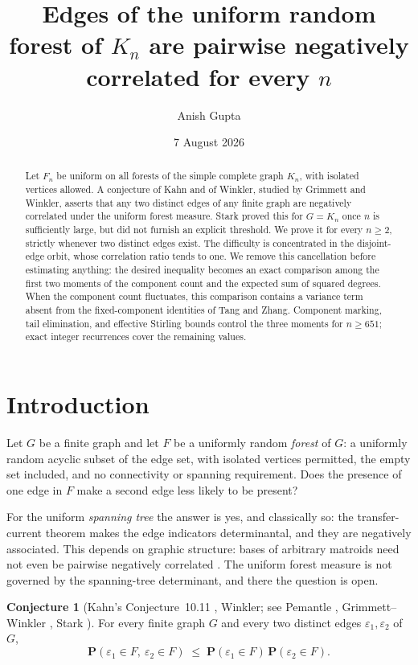 \documentclass[11pt,a4paper]{amsart}
\title[Negative correlation in uniform forests of $K_n$]
  {Edges of the uniform random forest of $K_n$ are pairwise negatively
  correlated for every $n$}
\author{Anish Gupta}
\date{7 August 2026}
\theoremstyle{plain}
\theoremstyle{definition}
\newtheorem{conjecture}[theorem]{Conjecture}
\newcommand{\PR}{\mathbf{P}}
\begin{document}
\begin{abstract}
Let $F_n$ be uniform on all forests of the simple complete graph $K_n$, with
isolated vertices allowed. A conjecture of Kahn and of Winkler, studied by
Grimmett and Winkler, asserts that any two distinct edges of any finite graph
are negatively correlated under the uniform forest measure. Stark proved this
for $G=K_n$ once $n$ is sufficiently large, but did not furnish an explicit
threshold. We prove it for every $n\ge2$, strictly whenever two
distinct edges exist. The difficulty is concentrated in the disjoint-edge
orbit, whose correlation ratio tends to one. We remove this cancellation
before estimating anything: the desired inequality becomes an exact comparison
among the first two moments of the component count and the expected sum of
squared degrees. When the component count fluctuates, this comparison contains
a variance term absent from the fixed-component identities of Tang and Zhang.
Component marking, tail elimination, and effective Stirling bounds control the
three moments for $n\ge651$; exact integer recurrences cover the remaining
values.
\end{abstract}

\maketitle

\section{Introduction}

Let $G$ be a finite graph and let $F$ be a uniformly random \emph{forest} of $G$:
a uniformly random acyclic subset of the edge set, with isolated vertices
permitted, the empty set included, and no connectivity or spanning requirement.
Does the presence of one edge in $F$ make a second edge less likely to be
present?

For the uniform \emph{spanning tree} the answer is yes, and classically so: the
transfer-current theorem makes the edge indicators determinantal, and they are
negatively associated. This depends on graphic structure: bases of arbitrary
matroids need not even be pairwise negatively correlated \cite{HSW2022}. The
uniform forest measure is not governed by the spanning-tree determinant, and
there the question is open.

\begin{conjecture}[Kahn's Conjecture~10.11 \cite{Kahn2000}, Winkler; see Pemantle \cite{Pemantle2000}, Grimmett--Winkler \cite{GW2004}, Stark \cite{Stark2011}]
\label{conj:gw}
For every finite graph $G$ and every two distinct edges $\varepsilon_1,\varepsilon_2$
of $G$,
\[
  \PR(\varepsilon_1 \in F,\ \varepsilon_2 \in F)
  \;\le\; \PR(\varepsilon_1 \in F)\,\PR(\varepsilon_2 \in F).
\]
\end{conjecture}
\end{document}
